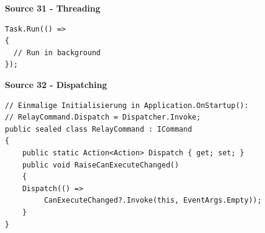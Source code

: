 \documentclass[10pt,twoside,landscape]{article}
\begin{document}
\begin{multicols}{2}
\textbf{Source 31 - Threading}
\lstset{language=csharp,label= ,caption= ,captionpos=b,numbers=none}
\begin{lstlisting}
Task.Run(() =>
{
  // Run in background
});
\end{lstlisting}

\textbf{Source 32 - Dispatching}
\lstset{language=csharp,label= ,caption= ,captionpos=b,numbers=none}
\begin{lstlisting}
// Einmalige Initialisierung in Application.OnStartup():
// RelayCommand.Dispatch = Dispatcher.Invoke;
public sealed class RelayCommand : ICommand
{
    public static Action<Action> Dispatch { get; set; }
    public void RaiseCanExecuteChanged()
    {
	Dispatch(() =>
		 CanExecuteChanged?.Invoke(this, EventArgs.Empty));
    }
}
\end{lstlisting}

\end{multicols}
\end{document}
